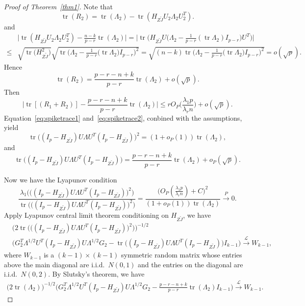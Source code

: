 \documentclass[review]{elsarticle}
\DeclareMathOperator{\mytr}{tr}
\theoremstyle{plain}
\theoremstyle{definition}
\theoremstyle{remark}
\begin{document}
\begin{proof}[\textrm{Proof of Theorem~\ref{thm1}}]
Note that
    $$
    \mytr(R_2)
    =
    \mytr(\Lambda_2)-\mytr(H_{Z\tilde{J}}U_2\Lambda_2 U_2^T).
    $$ 
and
    $$
    \begin{aligned}
        &
        \big|
    \mytr(H_{Z\tilde{J}}U_2\Lambda_2 U_2^T)
    -\frac{n-k}{p-r}\mytr(\Lambda_2)
    \big|
    =
    \big|
        \mytr\Big(H_{Z\tilde{J}} U \big(\Lambda_2-\frac{1}{p-r} (\mytr \Lambda_2) I_{p-r} \big) U^T\Big)
    \big|
        \\
        \leq &
        \sqrt{\mytr \big(H_{Z\tilde{J}}^2\big)}
        \sqrt{\mytr \Big(\Lambda_2-\frac{1}{p-r}\big(\mytr \Lambda_2\big) I_{p-r}\Big)^2}
        =\sqrt{(n-k)\mytr \Big(\Lambda_2-\frac{1}{p-r}\big(\mytr \Lambda_2\big) I_{p-r}\Big)^2}
        =o(\sqrt{p}).
    \end{aligned}
    $$
    Hence 
    $$
    \mytr(R_2)
    =
    \frac{p-r-n+k}{p-r}\mytr(\Lambda_2)+o(\sqrt{p}).
    $$
    Then
\begin{equation}\label{eq:spiketrace2}
\big| \mytr [(R_1+R_2)]-\frac{p-r-n+k}{p-r}\mytr(\Lambda_2)\big|\leq 
rO_P\big(\frac{\lambda_1 p}{\lambda_r n}\big)+o(\sqrt{p}).
\end{equation}
Equation~\eqref{eq:spiketrace1} and~\eqref{eq:spiketrace2}, conbined with the assumptions, yield
$$
    \mytr\big((I_p-H_{Z\tilde{J}})U\Lambda U^T (I_p-H_{Z\tilde{J}})\big)^2 
 =(1+o_P(1))\mytr(\Lambda_2),
$$
and
$$
\mytr\big((I_p-H_{Z\tilde{J}})U\Lambda U^T (I_p-H_{Z\tilde{J}})\big)
= \frac{p-r-n+k}{p-r}\mytr(\Lambda_2)+o_P(\sqrt{p}).
$$

Now we have the Lyapunov condition
$$
\frac{\lambda_1\Big(\big((I_p-H_{Z\tilde{J}})U\Lambda U^T (I_p-H_{Z\tilde{J}})\big)^2\Big)}{\mytr \Big( \big((I_p-H_{Z\tilde{J}})U\Lambda U^T (I_p-H_{Z\tilde{J}})\big)^2\Big)}
=
\frac{
\big( O_P(\frac{\lambda_1 p}{\lambda_r n})+C\big)^2
}{
    (1+o_P(1))\mytr(\Lambda_2)
}
\xrightarrow{P} 0.
$$
Apply Lyapunov central limit theorem conditioning on $H_{Z\tilde{J}}$, we have
$$
\begin{aligned}
    &\Big(2\mytr \Big( \big((I_p-H_{Z\tilde{J}})U\Lambda U^T (I_p-H_{Z\tilde{J}})\big)^2\Big) \Big)^{-1/2}\\
    &\big( G_2^T \Lambda^{1/2}U^T (I_p-H_{Z\tilde{J}})U\Lambda^{1/2}G_2
    -\mytr\big((I_p-H_{Z\tilde{J}})U\Lambda U^T (I_p-H_{Z\tilde{J}})\big)
     I_{k-1} \big)
\xrightarrow{\mathcal{L}} W_{k-1},
\end{aligned}
$$
where $W_{k-1}$ is a $(k-1)\times(k-1)$ symmetric random matrix whose entries above the main diagonal are i.i.d.\ $N(0,1)$ and the entries on the diagonal are i.i.d.\ $N(0,2)$.
By Slutsky's theorem, we have
$$
\begin{aligned}
    \Big(2 \mytr(\Lambda_2) \Big)^{-1/2}
    \big( G_2^T \Lambda^{1/2}U^T (I_p-H_{Z\tilde{J}})U\Lambda^{1/2}G_2
    -\tfrac{p-r-n+k}{p-r}\mytr(\Lambda_2)I_{k-1} \big)
\xrightarrow{\mathcal{L}} W_{k-1}.
\end{aligned}
$$




\end{proof}
\end{document}
